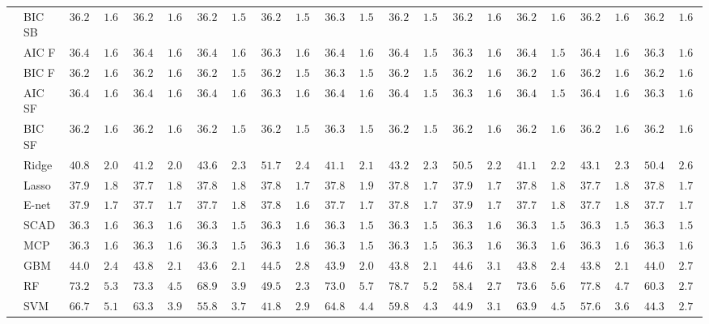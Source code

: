 \begin{tabular}{llllllllllllllllllllll}
	& BIC SB  & $36.28$ & $1.60$ & $36.26$ & $1.62$ & $36.28$ & $1.59$ & $36.26$ & $1.59$ & $36.30$ & $1.58$ & $36.29$ & $1.58$ & $36.29$ & $1.61$ & $36.29$ & $1.60$ & $36.28$ & $1.60$ & $36.28$ & $1.61$ \\
	& AIC F  & $36.41$ & $1.60$ & $36.41$ & $1.61$ & $36.40$ & $1.60$ & $36.39$ & $1.61$ & $36.41$ & $1.60$ & $36.41$ & $1.59$ & $36.37$ & $1.60$ & $36.40$ & $1.59$ & $36.40$ & $1.61$ & $36.39$ & $1.61$ \\
	& BIC F  & $36.28$ & $1.60$ & $36.26$ & $1.62$ & $36.28$ & $1.59$ & $36.26$ & $1.59$ & $36.30$ & $1.58$ & $36.28$ & $1.59$ & $36.28$ & $1.62$ & $36.29$ & $1.60$ & $36.28$ & $1.60$ & $36.28$ & $1.61$ \\
	& AIC SF  & $36.41$ & $1.60$ & $36.41$ & $1.61$ & $36.40$ & $1.60$ & $36.39$ & $1.61$ & $36.41$ & $1.60$ & $36.41$ & $1.59$ & $36.37$ & $1.60$ & $36.40$ & $1.59$ & $36.40$ & $1.61$ & $36.39$ & $1.61$ \\
	& BIC SF  & $36.28$ & $1.60$ & $36.26$ & $1.62$ & $36.28$ & $1.59$ & $36.26$ & $1.59$ & $36.30$ & $1.58$ & $36.28$ & $1.59$ & $36.28$ & $1.62$ & $36.29$ & $1.60$ & $36.28$ & $1.60$ & $36.28$ & $1.61$ \\
	& Ridge  & $40.85$ & $2.02$ & $41.21$ & $2.02$ & $43.66$ & $2.34$ & $51.70$ & $2.49$ & $41.15$ & $2.18$ & $43.27$ & $2.36$ & $50.50$ & $2.23$ & $41.19$ & $2.21$ & $43.13$ & $2.37$ & $50.49$ & $2.66$ \\
	& Lasso  & $37.99$ & $1.80$ & $37.77$ & $1.81$ & $37.82$ & $1.88$ & $37.89$ & $1.77$ & $37.85$ & $1.90$ & $37.85$ & $1.78$ & $37.99$ & $1.76$ & $37.83$ & $1.86$ & $37.76$ & $1.88$ & $37.81$ & $1.75$ \\
	& E-net  & $37.93$ & $1.76$ & $37.73$ & $1.75$ & $37.76$ & $1.82$ & $37.82$ & $1.68$ & $37.78$ & $1.78$ & $37.81$ & $1.78$ & $37.95$ & $1.72$ & $37.77$ & $1.83$ & $37.73$ & $1.85$ & $37.78$ & $1.74$ \\
	& SCAD  & $36.31$ & $1.60$ & $36.31$ & $1.61$ & $36.32$ & $1.58$ & $36.32$ & $1.60$ & $36.30$ & $1.58$ & $36.34$ & $1.58$ & $36.34$ & $1.61$ & $36.32$ & $1.59$ & $36.33$ & $1.59$ & $36.33$ & $1.59$ \\
	& MCP  & $36.33$ & $1.62$ & $36.31$ & $1.61$ & $36.32$ & $1.59$ & $36.30$ & $1.63$ & $36.32$ & $1.57$ & $36.32$ & $1.57$ & $36.33$ & $1.61$ & $36.33$ & $1.60$ & $36.33$ & $1.60$ & $36.34$ & $1.60$ \\
	& GBM  & $44.06$ & $2.40$ & $43.89$ & $2.11$ & $43.61$ & $2.18$ & $44.52$ & $2.85$ & $43.94$ & $2.08$ & $43.87$ & $2.18$ & $44.68$ & $3.13$ & $43.86$ & $2.42$ & $43.88$ & $2.17$ & $44.06$ & $2.77$ \\
	& RF  & $73.27$ & $5.35$ & $73.37$ & $4.50$ & $68.90$ & $3.97$ & $49.51$ & $2.33$ & $73.02$ & $5.72$ & $78.72$ & $5.21$ & $58.40$ & $2.75$ & $73.60$ & $5.60$ & $77.88$ & $4.72$ & $60.38$ & $2.71$ \\
	& SVM  & $66.76$ & $5.12$ & $63.36$ & $3.98$ & $55.88$ & $3.75$ & $41.80$ & $2.98$ & $64.85$ & $4.47$ & $59.86$ & $4.36$ & $44.94$ & $3.12$ & $63.99$ & $4.57$ & $57.67$ & $3.69$ & $44.39$ & $2.74$ \\
	\hline 
\end{tabular}